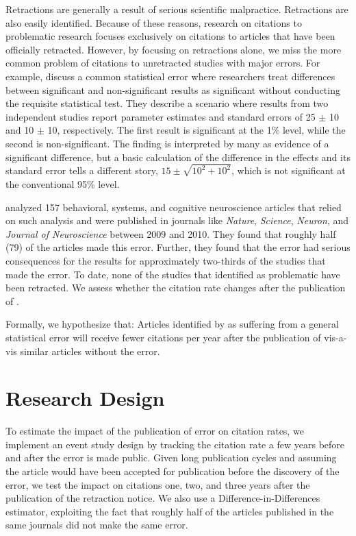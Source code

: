 \documentclass[12pt, letterpaper]{article}
\begin{document}
Retractions are generally a result of serious scientific malpractice. Retractions are also easily identified. Because of these reasons, research on citations to problematic research focuses exclusively on citations to articles that have been officially retracted. However, by focusing on retractions alone, we miss the more common problem of citations to unretracted studies with major errors. For example, \citet{gelman2006} discuss a common statistical error where researchers treat differences between significant and non-significant results as significant without conducting the requisite statistical test. They describe a scenario where results from two independent studies report parameter estimates and standard errors of 25 $\pm$ 10 and 10 $\pm$ 10, respectively. The first result is significant at the 1\% level, while the second is non-significant. The finding is interpreted by many as evidence of a significant difference, but a basic calculation of the difference in the effects and its standard error tells a different story, $15 \pm \sqrt{10^{2} + 10^{2}}$, which is not significant at the conventional 95\% level.

\citet{nieuwenhuis2011} analyzed 157 behavioral, systems, and cognitive neuroscience articles that relied on such analysis and were published in journals like \textit{Nature}, \textit{Science}, \textit{Neuron}, and \textit{Journal of Neuroscience} between 2009 and 2010. They found that roughly half (79) of the articles made this error. Further, they found that the error had serious consequences for the results for approximately two-thirds of the studies that made the error. To date, none of the studies that \citet{nieuwenhuis2011} identified as problematic have been retracted. We assess whether the citation rate changes after the publication of \citet{nieuwenhuis2011}.

Formally, we hypothesize that: Articles identified by \citet{nieuwenhuis2011} as suffering from a general statistical error will receive fewer citations per year after the publication of  \citet{nieuwenhuis2011} vis-a-vis similar articles without the error.

\section{Research Design}
To estimate the impact of the publication of error on citation rates, we implement an event study design by tracking the citation rate a few years before and after the error is made public. Given long publication cycles and assuming the article would have been accepted for publication before the discovery of the error, we test the impact on citations one, two, and three years after the publication of the retraction notice. We also use a Difference-in-Differences estimator, exploiting the fact that roughly half of the articles published in the same journals did not make the same error. 
\end{document}
